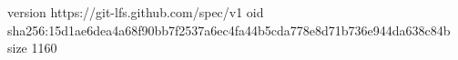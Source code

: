 version https://git-lfs.github.com/spec/v1
oid sha256:15d1ae6dea4a68f90bb7f2537a6ec4fa44b5cda778e8d71b736e944da638c84b
size 1160
